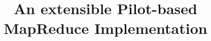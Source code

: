 \documentclass{acm_proc_article-sp}
\begin{document}
\title{An extensible Pilot-based MapReduce Implementation}

%
%
%
%
%
\end{document}

